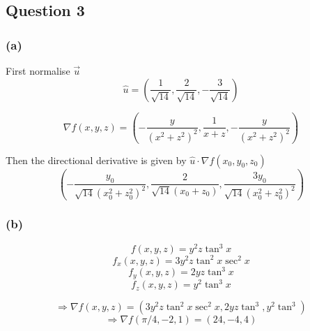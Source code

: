 \documentclass{article}
\begin{document}
\subsection*{Question 3}
\subsubsection*{(a)}
First normalise \(\vec{u}\)
\[
\hat{u} = \left(\frac{1}{\sqrt{14}}, \frac{2}{\sqrt{14}}, -\frac{3}{\sqrt{14}}\right)
\]

\[
\nabla f(x,y,z) = \left(-\frac{y}{(x^2+z^2)^2},\frac{1}{x+z} , -\frac{y}{(x^2+z^2)^2}\right)
\]

Then the directional derivative is given by \(\hat{u} \cdot \nabla f(x_0,y_0,z_0)\)
\[
\left(-\frac{y_0}{\sqrt{14}(x_0^2+z_0^2)^2},\frac{2}{\sqrt{14}(x_0+z_0)} , \frac{3y_0}{\sqrt{14}(x_0^2+z_0^2)^2}\right)
\]

\subsubsection*{(b)}
\[
f(x,y,z) = y^2z \tan^3x
\]
\[
f_x(x,y,z) = 3y^2z \tan^2x \sec^2x
\]
\[
f_y(x,y,z) = 2yz \tan^3x
\]
\[
f_z(x,y,z) = y^2 \tan^3x
\]

\[
\Rightarrow \nabla f(x,y,z) = (3y^2z \tan^2x \sec^2x, 2yz \tan^3, y^2 \tan^3)
\]
\[
\Rightarrow \nabla f(\pi / 4, -2, 1) = (24,-4,4)
\]
\end{document}
